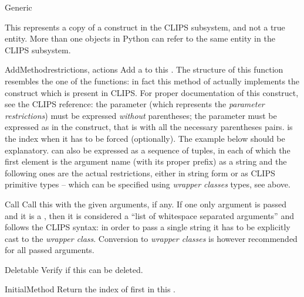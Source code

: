 \begin{classdesc*}{Generic}

This represents a copy of a  construct in the CLIPS
subsystem, and not a true  entity. More than one
 objects in Python can refer to the same
 entity in the CLIPS subsystem.

\begin{methoddesc}{AddMethod}{restrictions, actions}
Add a  to this . The structure of this
function resembles the one of the  functions:
in fact this method of  actually implements the
 construct which is present in CLIPS. For proper
documentation of this construct, see the CLIPS reference: the
 parameter (which represents the 
\emph{parameter restrictions}) must be expressed \emph{without}
parentheses; the  parameter must be expressed as in the
 construct, that is with all the necessary parentheses
pairs.  is the  index when it has to be forced
(optionally). The example below should be explanatory. 
can also be expressed as a sequence of tuples, in each of which the
first element is the argument name (with its proper prefix) as a string
and the following ones are the actual restrictions, either in string form
or as CLIPS primitive types -- which can be specified using \pyclips{}
\emph{wrapper classes} types, see above.
\end{methoddesc}

\begin{methoddesc}{Call}{}
Call this  with the given arguments, if any. If one only
argument is passed and it is a , then it is considered a
``list of whitespace separated arguments'' and follows the CLIPS
syntax: in order to pass a single string it has to be explicitly cast
to the  \emph{wrapper class}. Conversion to \emph{wrapper
classes} is however recommended for all passed arguments.
\end{methoddesc}

\begin{memberdesc}[property]{Deletable}
Verify if this  can be deleted.
\end{memberdesc}

\begin{methoddesc}{InitialMethod}{}
Return the index of first  in this .
\end{methoddesc}


\end{classdesc*}
